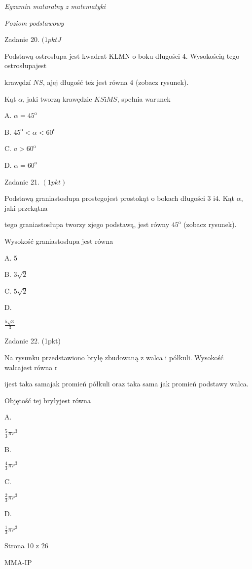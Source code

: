 \documentclass[a4paper,12pt]{article}
\begin{document}
{\it Egzamin maturalny z matematyki}

{\it Poziom podstawowy}

Zadanie 20. $(1pktJ$

Podstawą ostrosłupa jest kwadrat KLMN o boku długości 4. Wysokością tego ostrosłupajest

krawędzí $NS$, ajej długość $\mathrm{t}\mathrm{e}\dot{\mathrm{z}}$ jest równa 4 (zobacz rysunek).

Kąt $\alpha$, jaki tworzą krawędzie $KS\mathrm{i}MS$, spełnia warunek

A. $\alpha=45^{\mathrm{o}}$

B. $45^{\mathrm{o}}<\alpha<60^{\mathrm{o}}$

C. $a>60^{\mathrm{o}}$

D. $\alpha=60^{\mathrm{o}}$

Zadanie 21. $(1pkt)$

Podstawą graniastosłupa prostegojest prostokąt o bokach długości 3 $\mathrm{i}4$. Kąt $\alpha$, jaki przekątna

tego graniastosłupa tworzy zjego podstawą, jest równy $45^{\mathrm{o}}$ (zobacz rysunek).

Wysokość graniastosłupa jest równa

A. 5

B. $3\sqrt{2}$

C. $5\sqrt{2}$

D.

$\displaystyle \frac{5\sqrt{3}}{3}$

Zadanie 22. (1pkt)

Na rysunku przedstawiono bryłę zbudowaną z walca i półkuli. Wysokość walcajest równa r

ijest taka samajak promień półkuli oraz taka sama jak promień podstawy walca.

Objętość tej bryłyjest równa

A.

$\displaystyle \frac{5}{3}\pi r^{3}$

B.

$\displaystyle \frac{4}{3}\pi r^{3}$

C.

$\displaystyle \frac{2}{3}\pi r^{3}$

D.

$\displaystyle \frac{1}{3}\pi r^{3}$

Strona 10 z 26

MMA-IP
\end{document}
